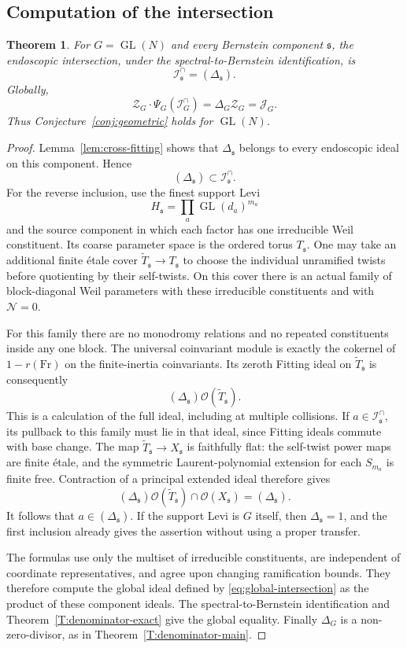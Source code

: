 \documentclass[11pt,a4paper]{amsart}
\newcommand{\OO}{\mathcal O}
\newcommand{\mcZ}{\mathcal Z}
\newcommand{\mcJ}{\mathcal J}
\newtheorem{theorem}{Theorem}[section]
\theoremstyle{definition}
\theoremstyle{remark}
\DeclareMathOperator{\GL}{GL}
\newcommand{\grs}{\mathfrak s}
\newcommand{\Icap}{\mathcal I^{\cap}}
\begin{document}
\subsection{Computation of the intersection}
\begin{theorem}\label{T:intersection-typeA}
For $G=\GL(N)$ and every Bernstein component $\grs$, the endoscopic
intersection, under the spectral-to-Bernstein identification, is
$$
 \Icap_{\grs}=(\Delta_{\grs}).
$$
Globally,
$$
 {\mcZ_G\cdot\Psi_G(\Icap_G)
            =\Delta_G\mcZ_G=\mcJ_G.}
$$
Thus Conjecture~\ref{conj:geometric} holds for $\GL(N)$.
\end{theorem}
\begin{proof}
Lemma~\ref{lem:cross-fitting} shows that $\Delta_{\grs}$ belongs
to every endoscopic ideal on this component. Hence
$$
 (\Delta_{\grs})\subset\Icap_{\grs}.
$$
For the reverse inclusion, use the finest support Levi
$$
 H_{\grs}=\prod_a\GL(d_a)^{m_a}
$$
and the source component in which each factor has one irreducible
Weil constituent. Its coarse parameter space is the ordered torus
$T_{\grs}$. One may take an additional finite \'etale cover
$\widetilde T_{\grs}\to T_{\grs}$ to choose the individual
unramified twists before quotienting by their self-twists. On this
cover there is an actual family of block-diagonal Weil parameters
with these irreducible constituents and with $\mathcal N=0$.

For this family there are no monodromy relations and no repeated
constituents inside any one block. The universal coinvariant module
is exactly the cokernel of $1-r(\mathrm{Fr})$ on the finite-inertia
coinvariants. Its zeroth Fitting ideal on $\widetilde T_{\grs}$
is consequently
$$
 (\Delta_{\grs})\OO(\widetilde T_{\grs}).
$$
This is a calculation of the full ideal, including at multiple
collisions. If $a\in\Icap_{\grs}$, its pullback to this family
must lie in that ideal, since Fitting ideals commute with base
change. The map
$\widetilde T_{\grs}\to X_{\grs}$ is faithfully flat:
the self-twist power maps are finite \'etale, and the symmetric
Laurent-polynomial extension for each $S_{m_a}$ is finite free.
Contraction of a principal extended ideal therefore gives
$$
 (\Delta_{\grs})\OO(\widetilde T_{\grs})
       \cap\OO(X_{\grs})=(\Delta_{\grs}).
$$
It follows that $a\in(\Delta_{\grs})$. If the support Levi is
$G$ itself, then $\Delta_{\grs}=1$, and the first inclusion already
gives the assertion without using a proper transfer.

The formulas use only the multiset of irreducible constituents,
are independent of coordinate representatives, and agree upon
changing ramification bounds. They therefore compute the global
ideal defined by \eqref{eq:global-intersection} as the product of
these component ideals. The spectral-to-Bernstein identification
and Theorem~\ref{T:denominator-exact} give the global equality.
Finally $\Delta_G$ is a non-zero-divisor, as in
Theorem~\ref{T:denominator-main}.
\end{proof}
\end{document}
